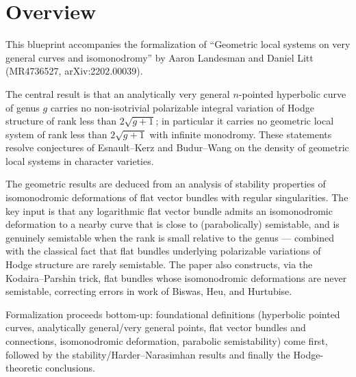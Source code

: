 \chapter{Overview}
\label{chap:overview}


This blueprint accompanies the formalization of ``Geometric local systems on very
general curves and isomonodromy'' by Aaron Landesman and Daniel Litt (MR4736527,
arXiv:2202.00039).

The central result is that an analytically very general $n$-pointed hyperbolic curve
of genus $g$ carries no non-isotrivial polarizable integral variation of Hodge
structure of rank less than $2\sqrt{g+1}$; in particular it carries no geometric local
system of rank less than $2\sqrt{g+1}$ with infinite monodromy. These statements
resolve conjectures of Esnault--Kerz and Budur--Wang on the density of geometric local
systems in character varieties.

The geometric results are deduced from an analysis of stability properties of
isomonodromic deformations of flat vector bundles with regular singularities. The key
input is that any logarithmic flat vector bundle admits an isomonodromic deformation to
a nearby curve that is close to (parabolically) semistable, and is genuinely
semistable when the rank is small relative to the genus --- combined with the classical
fact that flat bundles underlying polarizable variations of Hodge structure are rarely
semistable. The paper also constructs, via the Kodaira--Parshin trick, flat bundles
whose isomonodromic deformations are never semistable, correcting errors in work of
Biswas, Heu, and Hurtubise.

Formalization proceeds bottom-up: foundational definitions (hyperbolic pointed curves,
analytically general/very general points, flat vector bundles and connections,
isomonodromic deformation, parabolic semistability) come first, followed by the
stability/Harder--Narasimhan results and finally the Hodge-theoretic conclusions.
